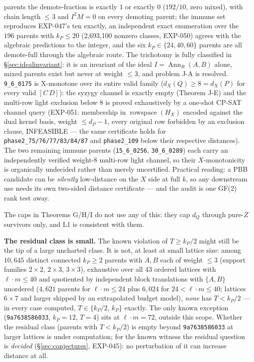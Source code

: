 \documentclass[11pt]{article}
\theoremstyle{plain}
\theoremstyle{remark}
\begin{document}
\begin{itemize}
{parents the demote-fraction is exactly $1$ or exactly $0$ ($192/10$, zero
mixed), with chain length $\le 3$ and $I^2M=0$ on every demoting parent}; the
immune set reproduces EXP-047's ten exactly, an independent exact enumeration
over the $196$ parents with $k_P\le20$ (2{,}693{,}100 nonzero classes,
EXP-050) agrees with the algebraic predictions to the integer, and the six
$k_P\in\{24,40,60\}$ parents are all demote-full through the algebraic route.
The trichotomy is fully classified in \S\ref{sec:idealinvariant}: it is an
invariant of the ideal $I=\operatorname{Ann}_R(A,B)$ alone, mixed parents exist
but never at weight $\le3$, and problem J-A is resolved.
\texttt{9\_6\_0175} is X-monotone over its entire valid family
($d_X(Q)\ge8=d_X(P)$ for every valid $[C\,D]$): the syzygy channel is exactly
empty (Theorem J-E) and the multi-row light exclusion below $8$ is proved
exhaustively by a one-shot CP-SAT channel query (EXP-051: membership in
$\operatorname{rowspace}(H_X)$ encoded against the dual kernel basis, weight
$\le d_P-1$, every original row forbidden by an exclusion clause, INFEASIBLE —
the same certificate holds for \texttt{phase2\_75/76/77/83/84/87} and
\texttt{phase2\_109} below their respective distances). The two remaining immune parents
(\texttt{15\_6\_0256}, \texttt{30\_6\_0289}) each carry an independently
verified weight-$8$ multi-row light channel, so their $X$-monotonicity is
organically undecided rather than merely uncertified. Practical reading: a PBB
candidate can be
\emph{silently} low-distance on the $X$ side at full $k$, so any downstream use needs
its own two-sided distance certificate --- and the audit is one GF(2) rank test away.
\end{itemize}
The caps in Theorems G/H/I do not use any of this: they cap
$d_Q$ through pure-$Z$ survivors only, and L1 is consistent with them.

\textbf{The residual class is small.} The known violation of $T\ge k_P/2$ might still
be the tip of a large uncharted class. It is not, at least at small lattice size: among
$10{,}645$ distinct connected $k_P\ge2$ parents with $A,B$ each of weight $\le3$
(support families $2{\times}2$, $2{\times}3$, $3{\times}3$), exhaustive over all $43$
ordered lattices with $\ell\cdot m\le 40$ and quotiented by independent block
translations with $\{A,B\}$ unordered ($4{,}621$ parents for $\ell\cdot m\le24$ plus
$6{,}024$ for $24<\ell\cdot m\le40$; lattices $6{\times}7$ and larger skipped by an
extrapolated budget model), \emph{none} has
$T<k_P/2$ --- in every case computed, $T\in\{k_P/2,\,k_P\}$ exactly. The only known
exception (\texttt{9a7638586033}, $k_P{=}12$, $T{=}4$) sits at
$\ell\cdot m=72$, outside this scope. Whether the residual class (parents with
$T<k_P/2$) is empty beyond \texttt{9a7638586033} at larger lattices is under
computation; for the known witness the residual question is \emph{decided}
(\S\ref{sec:conjectures}, EXP-045): no perturbation of it can increase distance at all.
\end{document}
